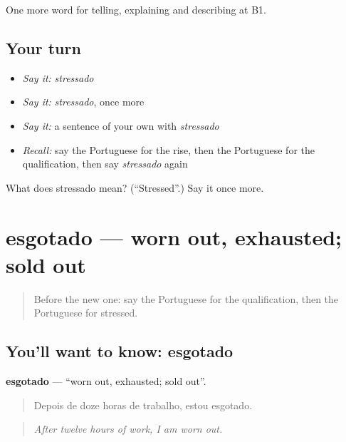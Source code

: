 \begin{grammarlens}[title={What you've built}]
One more word for telling, explaining and describing at B1.
\end{grammarlens}

\subsection*{Your turn}
\begin{itemize}
\raggedright
  \item \emph{Say it:} \emph{stressado}
  \item \emph{Say it:} \emph{stressado}, once more
  \item \emph{Say it:} a sentence of your own with \emph{stressado}
  \item \emph{Recall:} say the Portuguese for the rise, then the Portuguese for the qualification, then say \emph{stressado} again
\end{itemize}

\begin{tcolorbox}[breakable,colback=teal!4,colframe=teal!35!black,title={Before you move on}]
What does stressado mean? (\textquotedblleft{}Stressed\textquotedblright{}.) Say it once more.
\end{tcolorbox}
\section[esgotado]{esgotado — worn out, exhausted; sold out}

\label{lesson:PT-C361-esgotado}



\begin{quote}
Before the new one: say the Portuguese for the qualification, then the Portuguese for stressed.
\end{quote}

\subsection*{You'll want to know: esgotado}
\textbf{esgotado} — \textquotedblleft{}worn out, exhausted; sold out\textquotedblright{}.

\begin{quote}
Depois de doze horas de trabalho, estou esgotado.
\end{quote}

\begin{quote}
\emph{After twelve hours of work, I am worn out.}
\end{quote}

